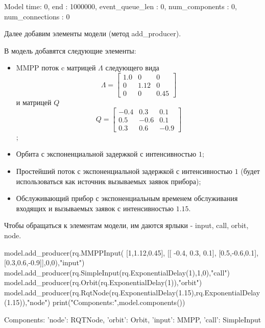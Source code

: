 \begin{pyout}
	Model{ time: 0, end : 1000000, event_queue_len : 0, num_components : 0, num_connections : 0 }
\end{pyout}

Далее добавим элементы модели (метод add\_producer). 

В модель добавятся следующие элементы: 
\begin{itemize}
	\item MMPP поток c матрицей $\Lambda$ следующего вида
		\begin{equation*}
			\Lambda =  \begin{bmatrix}
			1.0 & 0 &  0\\
			0 & 1.12 & 0\\
			0 & 0 &	0.45
			\end{bmatrix}
		\end{equation*} и матрицей $Q$
		\begin{equation*}
			Q =  \begin{bmatrix}
				-0.4 & 0.3 &  0.1\\
				0.5 & -0.6 & 0.1\\
				0.3 & 0.6 &	-0.9
			\end{bmatrix}
		\end{equation*};
	\item Орбита с экспоненциальной задержкой с интенсивностью $1$;
	\item Простейший поток с экспоненциальной задержкой с интенсивностью $1$ (будет использоваться как источник вызываемых заявок прибора);
	\item Обслуживающий прибор с экспоненциальным временем обслуживания входящих и вызываемых заявок с интенсивностью $1.15$.
\end{itemize}
Чтобы обращаться к элементам модели, им даются ярлыки - input, call, orbit, node.


\begin{pyin}
model.add_producer(rq.MMPPInput(
[1,1.12,0.45],
[[ -0.4, 0.3, 0.1],
[0.5,-0.6,0.1],
[0.3,0.6,-0.9]],0,0),"input")
model.add_producer(rq.SimpleInput(rq.ExponentialDelay(1),1,0),"call")
model.add_producer(rq.Orbit(rq.ExponentialDelay(1)),"orbit")
model.add_producer(rq.RqtNode(rq.ExponentialDelay(1.15),rq.ExponentialDelay(1.15)),"node")
print("Components:",model.components())
\end{pyin}

\begin{pyout}
	Components: {'node': RQTNode, 'orbit': Orbit, 'input': MMPP, 'call': SimpleInput}
\end{pyout}

